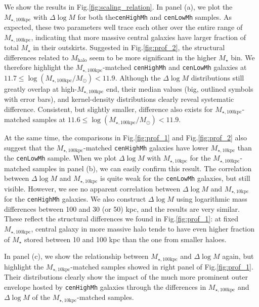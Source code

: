 \documentclass{emulateapj}
\def\rbcg{\texttt{cenHighMh}}
\def\nbcg{\texttt{cenLowMh}}
\def\mstar{{$M_{\star}$}}
\def\mhalo{{$M_{\mathrm{halo}}$}}
\def\minn{{$M_{\star,10\mathrm{kpc}}$}}
\def\mtot{{$M_{\star,100\mathrm{kpc}}$}}
\def\logmtot{{$\log (M_{\star,100\mathrm{kpc}}/M_{\odot})$}}
\newcommand{\update}[1]{\textcolor{Bittersweet}{#1}}
\begin{document}
\begin{CJK*}{UTF8}{gbsn}
    We show the results in Fig.\ref{fig:scaling_relation}.  
    In panel (a), we plot the \mtot{} with $\Delta \log M$ for both the\rbcg{} 
    and \nbcg{} samples. 
    As expected, these two parameters well trace each other over the entire range of
    \mtot{}, indicating that more massive central galaxies have larger 
    fraction of total \mstar{} in their outskirts. 
    Suggested in Fig.\ref{fig:prof_2}, the structural differences related to 
    \mhalo{} seem to be more significant in the higher \mstar{} bin. 
    We therefore highlight the \mtot{}-matched \rbcg{} and \nbcg{} galaxies at 
    $11.7 \leq$\logmtot$< 11.9$. 
    Although the $\Delta \log M$ distributions still greatly overlap at high-\mtot{} 
    end, their median values (big, outlined symbols with error bars),
    and kernel-density distributions clearly reveal systematic difference. 
    Consistent, but slightly smaller, difference also exists for \mtot{}-matched 
    samples at $11.6 \leq$\logmtot$< 11.9$. 
    
    At the same time, the comparisons in Fig.\ref{fig:prof_1} and 
    Fig.\ref{fig:prof_2} also suggest that the \mtot{}-matched \rbcg{} galaxies 
    have lower \minn{} than the \nbcg{} sample. 
    \update{
    When we plot $\Delta \log M$ with \minn{} for the \mtot{}-matched samples in 
    panel (b), we can easily confirm this result.
    The correlation between $\Delta \log M$ and \minn{} is quite weak for the 
    \nbcg{} galaxies, but still visible. 
    However, we see no apparent correlation between $\Delta \log M$ and \minn{} 
    for the \rbcg{} galaxies. 
    We also construct $\Delta \log M$ using logarithmic mass differences between 
    100 and 30 (or 50) kpc, and the results are very similar.   
    These reflect the structural differences we found in Fig.\ref{fig:prof_1}: 
    at fixed \mtot{}, central galaxy in more massive halo tende to have even higher 
    fraction of \mstar{} stored between 10 and 100 kpc than the one from smaller 
    haloes.}
    
    In panel (c), we show the relationship between \mtot{} and $\Delta \log M$ 
    again, but highlight the \minn{}-matched samples showed in right panel of 
    Fig.\ref{fig:prof_1}. 
    \update{
    Their distributions clearly show the impact of the much more prominent outer 
    envelope hosted by \rbcg{} galaxies through the differences in \mtot{} and 
    $\Delta \log M$ of the \minn{}-matched samples.
    }
    

\end{CJK*}
\end{document}
